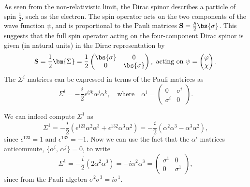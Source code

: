 As seen from the non-relativistic limit, the Dirac spinor describes a particle of spin \(\tfrac12\), such as the electron. The spin operator acts on the two components of the wave function \(\psi\), and is proportional to the Pauli matrices \(\mathbf{S} = \frac{\hbar}{2}\bs{\sigma}\). This suggests that the full spin operator acting on the four-component Dirac spinor is given (in natural units) in the Dirac representation by
\[
    \mathbf{S} = \frac{1}{2} \bm{\Sigma} = \frac{1}{2} \begin{pmatrix}
        \bs{\sigma} & 0           \\
        0           & \bs{\sigma}
    \end{pmatrix}, \text{ acting on } \psi = \begin{pmatrix}
        \varphi \\
        \chi
    \end{pmatrix}.
\]
The \(\Sigma^i\) matrices can be expressed in terms of the Pauli matrices as
\[
    \Sigma^i = -\frac{i}{2} \epsilon^{ijk} \alpha^j \alpha^k, \quad \text{where} \quad \alpha^i = \begin{pmatrix}
        0        & \sigma^i \\
        \sigma^i & 0
    \end{pmatrix}.
\]
\begin{example}
    We can indeed compute \(\Sigma^1\) as
    \[
        \Sigma^1 = -\frac{i}{2} \left(\epsilon^{123} \alpha^2 \alpha^3 + \epsilon^{132} \alpha^3 \alpha^2\right) = -\frac{i}{2} \left(\alpha^2 \alpha^3 - \alpha^3 \alpha^2\right),
    \]
    since \(\epsilon^{123} = 1\) and \(\epsilon^{132} = -1\). Now we can use the fact that the \(\alpha^i\) matrices anticommute, \(\{\alpha^i,\, \alpha^j\} = 0\), to write
    \[
        \Sigma^1 = -\frac{i}{2} \left(2 \alpha^2 \alpha^3\right) = -i \alpha^2 \alpha^3 = \begin{pmatrix}
            \sigma^1 & 0        \\
            0        & \sigma^1
        \end{pmatrix},
    \]
    since from the Pauli algebra \(\sigma^2 \sigma^3 = i \sigma^1\).

\end{example}

